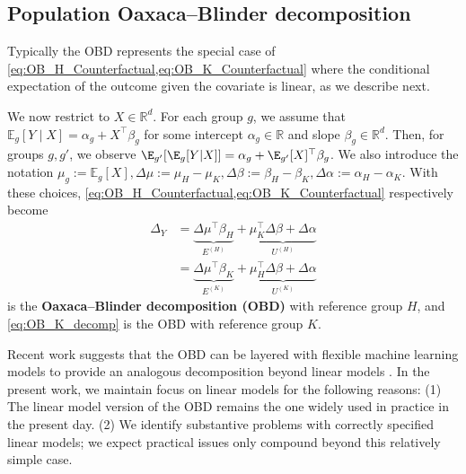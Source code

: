 \subsection{Population Oaxaca--Blinder decomposition} 
\label{sec:ob}

Typically the OBD represents the special case of \cref{eq:OB_H_Counterfactual,eq:OB_K_Counterfactual} 
where the conditional expectation of the outcome given the covariate is linear, as we describe next.

We now restrict to $X \in \mathbb{R}^d$. For each group $g$, we assume that $\mathbb{E}_g[Y \mid X] = \alpha_g + X^\top \beta_g$
for some intercept $\alpha_g \in \mathbb{R}$ and slope $\beta_g \in \mathbb{R}^d$.
Then, for groups $g,g'$, we observe $\E_{g'} [ \E_g  [ Y | X ] ] = \alpha_g + \E_{g'}[X]^\top \beta_g$.
We also introduce the notation
$\mu_g := \mathbb{E}_g[X],
\Delta \mu := \mu_H - \mu_K,
\Delta \beta := \beta_H - \beta_K,
\Delta \alpha := \alpha_H - \alpha_K.
$
With these choices,
\cref{eq:OB_H_Counterfactual,eq:OB_K_Counterfactual} respectively become
\begin{align}
    \label{eq:OB_H_decomp}
	\Delta_Y &= \underbrace{\Delta \mu^\top \beta_H}_{E^{(H)}} + \underbrace{\mu_K^\top \Delta \beta + \Delta \alpha}_{U^{(H)}} \\
    \label{eq:OB_K_decomp}
	&= \underbrace{\Delta \mu^\top \beta_K}_{E^{(K)}} + \underbrace{\mu_H^\top \Delta \beta + \Delta \alpha}_{U^{(K)}}
\end{align}
 is the \textbf{Oaxaca--Blinder decomposition (OBD)} with reference group $H$, and \cref{eq:OB_K_decomp}
is the OBD with reference group $K$.

Recent work suggests that the OBD can be layered with flexible machine learning models to provide 
an analogous decomposition beyond linear models \citep{bach2024heterogeneity,quintas2024multiply,quintero2025}. In the present work, we maintain focus on linear models for the following reasons:
(1) The linear model version of the OBD remains the one widely used in practice in the present day.
(2) We identify substantive problems with correctly specified linear models; we expect practical issues only compound beyond this relatively simple case.


